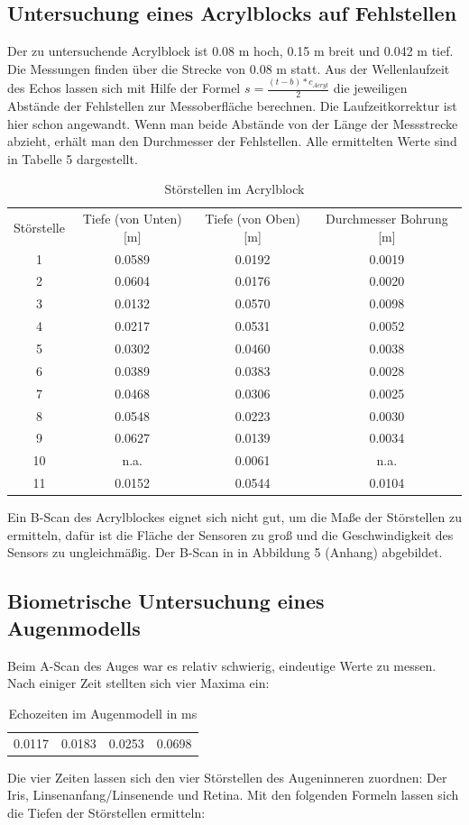 \documentclass[11pt,ngerman,a4paper]{article}
\begin{document}
\subsection{Untersuchung eines Acrylblocks auf Fehlstellen}
Der zu untersuchende Acrylblock ist 0.08 m hoch, 0.15 m breit und 0.042 m tief. Die Messungen finden über die Strecke von 0.08 m statt. Aus der Wellenlaufzeit des Echos lassen sich mit Hilfe der Formel $s=\frac{(t-b)*c_{Acryl}}{2}$ die jeweiligen Abstände der Fehlstellen zur Messoberfläche berechnen. Die Laufzeitkorrektur ist hier schon angewandt. Wenn man beide Abstände von der Länge der Messstrecke abzieht, erhält man den Durchmesser der Fehlstellen.  Alle ermittelten Werte sind in Tabelle 5 dargestellt.
\begin{table}[h]
\centering
 \begin{tabular}{|c||c|c|c|}
Störstelle  & Tiefe (von Unten)[m] & Tiefe (von Oben)[m]& Durchmesser Bohrung [m] \\
1 & 0.0589 & 0.0192 & 0.0019 \\
2 & 0.0604 & 0.0176 & 0.0020 \\
3 & 0.0132 & 0.0570 & 0.0098 \\
4 & 0.0217 & 0.0531 & 0.0052 \\
5 & 0.0302 & 0.0460 & 0.0038 \\
6 & 0.0389 & 0.0383 & 0.0028 \\
7 & 0.0468 & 0.0306 & 0.0025 \\
8 & 0.0548 & 0.0223 & 0.0030 \\
9 & 0.0627 & 0.0139 & 0.0034 \\
10 & n.a. & 0.0061 & n.a. \\
11 & 0.0152 & 0.0544 & 0.0104 \\
 \end{tabular}
\caption{Störstellen im Acrylblock}
\end{table}
Ein B-Scan des Acrylblockes eignet sich nicht gut, um die Maße der Störstellen zu ermitteln, dafür ist die Fläche der Sensoren zu groß und die Geschwindigkeit des Sensors zu ungleichmäßig. Der B-Scan in in Abbildung 5 (Anhang) abgebildet.
\subsection{Biometrische Untersuchung eines Augenmodells}
Beim A-Scan des Auges war es relativ schwierig, eindeutige Werte zu messen. Nach einiger Zeit stellten sich vier Maxima ein:
\begin{table}[h]
\centering
 \begin{tabular}{|c|c|c|c|}
 0.0117 & 0.0183 & 0.0253 & 0.0698 \\
 \end{tabular}
\caption{Echozeiten im Augenmodell in ms}
\end{table}
\newline
Die vier Zeiten lassen sich den vier Störstellen des Augeninneren zuordnen: Der Iris, Linsenanfang/Linsenende und Retina. 
Mit den folgenden Formeln lassen sich die Tiefen der Störstellen ermitteln:
\end{document}
